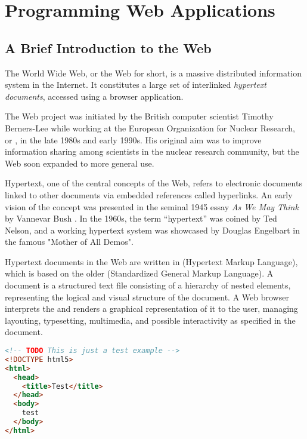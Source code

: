 \chapter{Programming Web Applications}

\section{A Brief Introduction to the Web}

The World Wide Web, or the Web for short, is a massive distributed information system in the Internet. It constitutes a large set of interlinked \emph{hypertext documents}, accessed using a browser application.

The Web project was initiated by the British computer scientist Timothy Berners-Lee while working at the European Organization for Nuclear Research, or , in the late \num{1980s} and early \num{1990s}. His original aim was to improve information sharing among scientists in the nuclear research community, but the Web soon expanded to more general use. \cite{TblProposal} \cite{TblWWW}

Hypertext, one of the central concepts of the Web, refers to electronic documents linked to other documents via embedded references called hyperlinks. An early vision of the concept was presented in the seminal \num{1945} essay \emph{As We May Think} by Vannevar Bush \cite{Bush45}. In the \num{1960s}, the term ``hypertext'' was coined by Ted Nelson, and a working hypertext system was showcased by Douglas Engelbart in the famous "Mother of All Demos".

Hypertext documents in the Web are written in  (Hypertext Markup Language), which is based on the older  (Standardized General Markup Language). A  document is a structured text file consisting of a hierarchy of nested elements, representing the logical and visual structure of the document. A Web browser interprets the  and renders a graphical representation of it to the user, managing layouting, typesetting, multimedia, and possible interactivity as specified in the document. \cite{HTML20}

\begin{code}
\label{listing:html}
\begin{lstlisting}[language=HTML,caption=A small \ab{html} document]
<!-- TODO This is just a test example -->
<!DOCTYPE html5>
<html>
  <head>
    <title>Test</title>
  </head>
  <body>
    test
  </body>
</html>
\end{lstlisting}
\end{code}

